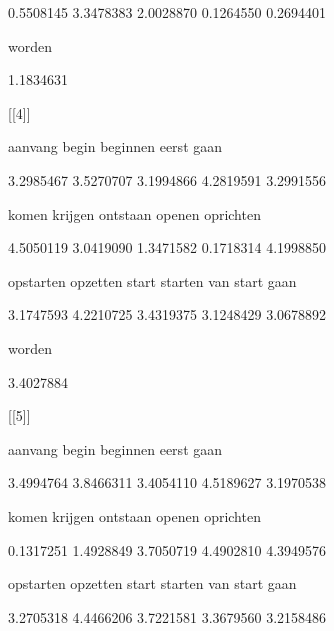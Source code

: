      0.5508145      3.3478383      2.0028870      0.1264550      0.2694401 



        worden 



     1.1834631 



[[4]]



       aanvang          begin       beginnen          eerst           gaan 



     3.2985467      3.5270707      3.1994866      4.2819591      3.2991556 



         komen        krijgen       ontstaan         openen      oprichten 



     4.5050119      3.0419090      1.3471582      0.1718314      4.1998850 



     opstarten       opzetten          start        starten van start gaan 



     3.1747593      4.2210725      3.4319375      3.1248429      3.0678892 



        worden 



     3.4027884 



[[5]]



       aanvang          begin       beginnen          eerst           gaan 



     3.4994764      3.8466311      3.4054110      4.5189627      3.1970538 



         komen        krijgen       ontstaan         openen      oprichten 



     0.1317251      1.4928849      3.7050719      4.4902810      4.3949576 



     opstarten       opzetten          start        starten van start gaan 



     3.2705318      4.4466206      3.7221581      3.3679560      3.2158486 



